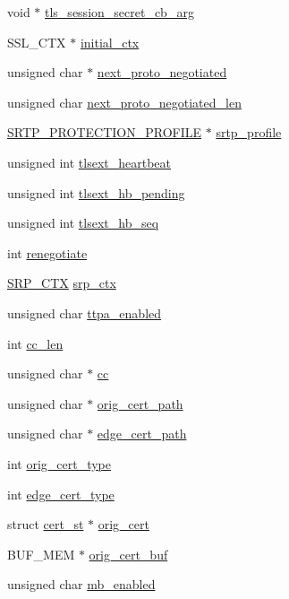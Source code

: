 \begin{DoxyCompactItemize}
\item 
void $\ast$ \hyperlink{structssl__st_a3e4db63ea16d50062c8b2b062bb648d9}{tls\-\_\-session\-\_\-secret\-\_\-cb\-\_\-arg}
\item 
S\-S\-L\-\_\-\-C\-T\-X $\ast$ \hyperlink{structssl__st_a704ffea820953b3ca385ce14e6efe570}{initial\-\_\-ctx}
\item 
unsigned char $\ast$ \hyperlink{structssl__st_aef796f12c3e90c045baad0cd1841e180}{next\-\_\-proto\-\_\-negotiated}
\item 
unsigned char \hyperlink{structssl__st_aa530fc5efd1d6b0f5f881dbd78b6d3de}{next\-\_\-proto\-\_\-negotiated\-\_\-len}
\item 
\hyperlink{ssl_8h_ad71374b5a3df5292d0722b703841292e}{S\-R\-T\-P\-\_\-\-P\-R\-O\-T\-E\-C\-T\-I\-O\-N\-\_\-\-P\-R\-O\-F\-I\-L\-E} $\ast$ \hyperlink{structssl__st_ae8776b7b0b446fb823d9f87176bcfa1d}{srtp\-\_\-profile}
\item 
unsigned int \hyperlink{structssl__st_a8ad372425499d47c2254c89fbcd0deed}{tlsext\-\_\-heartbeat}
\item 
unsigned int \hyperlink{structssl__st_a2abf4f35ea6d829b809e2c7c82acdd1f}{tlsext\-\_\-hb\-\_\-pending}
\item 
unsigned int \hyperlink{structssl__st_af5db9aefebe8c45e8f063d2033b1bffd}{tlsext\-\_\-hb\-\_\-seq}
\item 
int \hyperlink{structssl__st_a0a493dfdeb51c5c0a73107e0579e9601}{renegotiate}
\item 
\hyperlink{ssl_8h_aed13ca5c0b6c032c4fb830dea5e80b55}{S\-R\-P\-\_\-\-C\-T\-X} \hyperlink{structssl__st_aaef9c47543427df406b33888d147f65d}{srp\-\_\-ctx}
\item 
unsigned char \hyperlink{structssl__st_a9404c2c0f1e2031205c6fa7c3309979f}{ttpa\-\_\-enabled}
\item 
int \hyperlink{structssl__st_a18e3426d378cc03bde20f422c5e1481a}{cc\-\_\-len}
\item 
unsigned char $\ast$ \hyperlink{structssl__st_a8d2686e3d92c65618418f05c8b8c591e}{cc}
\item 
unsigned char $\ast$ \hyperlink{structssl__st_a457fa5a39af71dc84d36d557e14944ba}{orig\-\_\-cert\-\_\-path}
\item 
unsigned char $\ast$ \hyperlink{structssl__st_a53a83997e5d64f75f2ebe843fcb6f3cc}{edge\-\_\-cert\-\_\-path}
\item 
int \hyperlink{structssl__st_a4bda4111131c8458ff2f2a4efa7b3fd9}{orig\-\_\-cert\-\_\-type}
\item 
int \hyperlink{structssl__st_a2ba5be5897d7e9e40fad0c66b6e8622a}{edge\-\_\-cert\-\_\-type}
\item 
struct \hyperlink{structcert__st}{cert\-\_\-st} $\ast$ \hyperlink{structssl__st_a3602b569b8f958fc0d8d07015683bf7d}{orig\-\_\-cert}
\item 
B\-U\-F\-\_\-\-M\-E\-M $\ast$ \hyperlink{structssl__st_afabfaaeb3df30b1ba0bd3683bdc33b03}{orig\-\_\-cert\-\_\-buf}
\item 
unsigned char \hyperlink{structssl__st_a7655adab91ac4a50f8bbc94c8b915f04}{mb\-\_\-enabled}
\end{DoxyCompactItemize}


